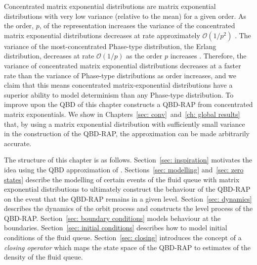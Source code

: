 Concentrated matrix exponential distributions are matrix exponential distributions with very low variance (relative to the mean) for a given order. As the order, \(p\), of the representation increases the variance of the concentrated matrix exponential distributions decreases at rate approximately \(\mathcal O(1/p^2)\) \citep{hht2020}. The variance of the most-concentrated Phase-type distribution, the Erlang distribution, decreases at rate \(\mathcal O(1/p)\) as the order \(p\) increases \citep{as1987}. Therefore, the variance of concentrated matrix exponential distributions decreases at a faster rate than the variance of Phase-type distributions as order increases, and we claim that this means concentrated matrix-exponential distributions have a superior ability to model determinism than any Phase-type distribution. To improve upon the QBD of \cite{bo2013} this chapter constructs a QBD-RAP from concentrated matrix exponentials. We show in Chapters~\ref{sec: conv}~and~\ref{ch: global results} that, by using a matrix exponential distribution with sufficiently small variance in the construction of the QBD-RAP, the approximation can be made arbitrarily accurate. %

The structure of this chapter is as follows. Section~\ref{sec: inspiration} motivates the idea using the QBD approximation of \cite{bo2014}. Sections~\ref{sec: modelling} and~\ref{sec: zero states} describe the modelling of certain events of the fluid queue with matrix exponential distributions to ultimately construct the behaviour of the QBD-RAP on the event that the QBD-RAP remains in a given level. Section~\ref{sec: dynamics} describes the dynamics of the orbit process and constructs the level process of the QBD-RAP. Section~\ref{sec: boundary conditions} models behaviour at the boundaries. Section~\ref{sec: initial conditions} describes how to model initial conditions of the fluid queue. Section~\ref{sec: closing} introduces the concept of a \emph{closing operator} which maps the state space of the QBD-RAP to estimates of the density of the fluid queue. 


